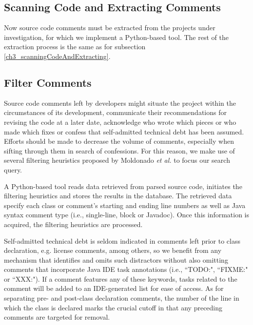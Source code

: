 \subsection{Scanning Code and Extracting Comments}

Now source code comments must be extracted from the projects under investigation, for which we implement a Python-based tool. The rest of the extraction process is the same as for subsection \ref{ch3_scanningCodeAndExtracting}. 


\subsection{Filter Comments}


\revision Source code comments left by developers might situate the project within the circumstances of its development, communicate their recommendations for revising the code at a later date, acknowledge who wrote which pieces or who made which fixes or confess that self-admitted technical debt has been assumed. Efforts should be made to decrease the volume of comments, especially when sifting through them in search of \SATD confessions. For this reason, we make use of several filtering heuristics proposed by Moldonado \textit{et al.} \cite{Maldonado_TSE2017} to focus our search query.\par

A Python-based tool reads data retrieved from parsed source code, initiates the filtering heuristics and stores the results in the database. The retrieved data specify each class or comment's starting and ending line numbers as well as Java syntax comment type (i.e., single-line, block or Javadoc). Once this information is acquired, the filtering heuristics are processed. \par

Self-admitted technical debt is seldom indicated in comments left prior to class declaration, e.g. license comments, among others, so we benefit from any mechanism that identifies and omits such distractors without also omitting comments that incorporate Java IDE task annotations (i.e., ``TODO:", ``FIXME:" or ``XXX:"). If a comment features any of these keywords, tasks related to the comment will be added to an IDE-generated list for ease of access. As for separating pre- and post-class declaration comments, the number of the line in which the class is declared marks the crucial cutoff in that any preceding comments are targeted for removal.\par

